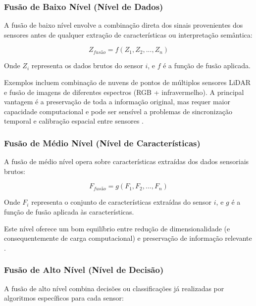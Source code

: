 \subsubsection{Fusão de Baixo Nível (Nível de Dados)}

A fusão de baixo nível envolve a combinação direta dos sinais provenientes dos sensores antes de qualquer extração de características ou interpretação semântica:

\begin{equation}
Z_{fusão} = f(Z_1, Z_2, ..., Z_n)
\end{equation}

Onde $Z_i$ representa os dados brutos do sensor $i$, e $f$ é a função de fusão aplicada.

Exemplos incluem combinação de nuvens de pontos de múltiplos sensores \ac{LiDAR} e fusão de imagens de diferentes espectros (\ac{RGB} + infravermelho). A principal vantagem é a preservação de toda a informação original, mas requer maior capacidade computacional e pode ser sensível a problemas de sincronização temporal e calibração espacial entre sensores \cite{Schneider2018FusaoSensores}.

\subsubsection{Fusão de Médio Nível (Nível de Características)}

A fusão de médio nível opera sobre características extraídas dos dados sensoriais brutos:

\begin{equation}
F_{fusão} = g(F_1, F_2, ..., F_n)
\end{equation}

Onde $F_i$ representa o conjunto de características extraídas do sensor $i$, e $g$ é a função de fusão aplicada às características.

Este nível oferece um bom equilíbrio entre redução de dimensionalidade (e consequentemente de carga computacional) e preservação de informação relevante \cite{Grassi2006ArquiteturaHibrida}.

\subsubsection{Fusão de Alto Nível (Nível de Decisão)}

A fusão de alto nível combina decisões ou classificações já realizadas por algoritmos específicos para cada sensor:

